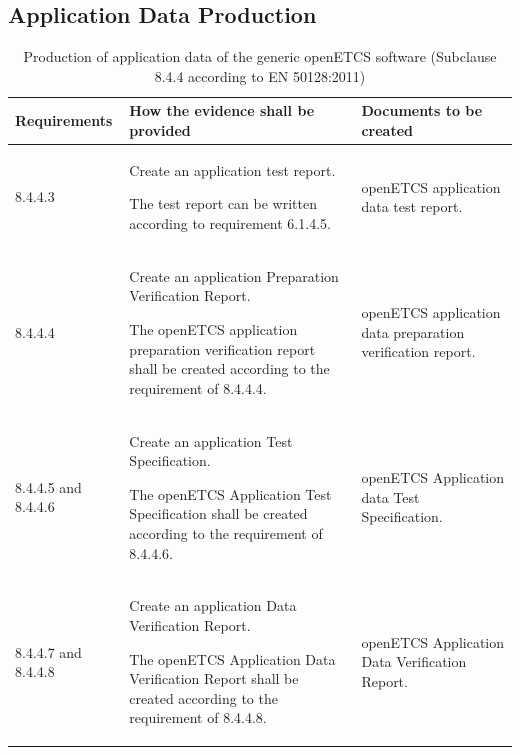 \documentclass{template/openetcs_report}
\begin{document}
\subsection{Application Data Production}
{\footnotesize\sffamily\centering
\begin{longtable}{|p{2cm}|p{9cm}|p{3cm}|}
\caption{Production of application data of the generic openETCS software (Subclause 8.4.4 according to EN 50128:2011)}\\
\hline
\bfseries Requirements & \bfseries How the evidence shall be provided & \bfseries Documents to be created\\
\hline
\hline
\endhead
\hline
\endfoot

8.4.4.3 & Create an application test report.

The test report can be written according to requirement 6.1.4.5.
& openETCS application data test report.\\ 
\hline
8.4.4.4 & Create an application Preparation Verification Report.

The openETCS application preparation verification report shall be created according to the requirement of 8.4.4.4.
& openETCS application data preparation verification report.\\ 
\hline
8.4.4.5 and 8.4.4.6 & Create an application Test Specification.

The openETCS Application Test Specification shall be created according to the requirement of 8.4.4.6.
& openETCS Application data Test Specification.\\ 
\hline
8.4.4.7 and 8.4.4.8 & Create an application Data Verification Report.

The openETCS Application Data Verification Report shall be created according to the requirement of 8.4.4.8.
& openETCS Application Data Verification Report.\\ 
\hline
\end{longtable}}
\end{document}

